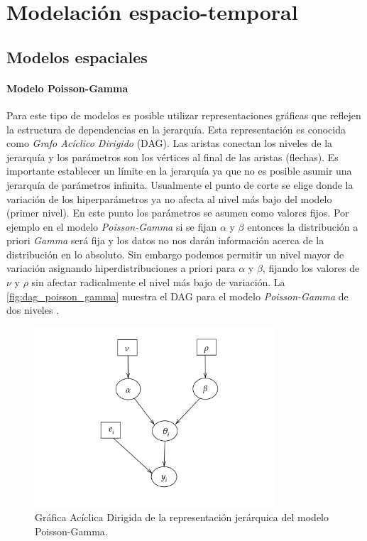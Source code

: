 \chapter{Modelación espacio-temporal} \label{chap:modeling}

\section{Modelos espaciales} \label{sec:spatial_models}

\subsubsection{Modelo Poisson-Gamma} \label{subsubsec:bayesian_poisson_gamma}

Para este tipo de modelos es posible utilizar representaciones gráficas que reflejen la estructura de dependencias en la jerarquía. Esta representación es conocida como \textit{Grafo Acíclico Dirigido} (DAG). Las aristas conectan los niveles de la jerarquía y los parámetros son los vértices al final de las aristas (flechas). Es importante establecer un límite en la jerarquía ya que no es posible asumir una jerarquía de parámetros infinita. Usualmente el punto de corte se elige donde la variación de los hiperparámetros ya no afecta al nivel más bajo del modelo (primer nivel). En este punto los parámetros se asumen como valores fijos. Por ejemplo en el modelo \textit{Poisson-Gamma} si se fijan $\alpha$ y $\beta$ entonces la distribución a priori \textit{Gamma} será fija y los datos no nos darán información acerca de la distribución en lo absoluto. Sin embargo podemos permitir un nivel mayor de variación asignando hiperdistribuciones a priori para $\alpha$ y $\beta$, fijando los valores de $\nu$ y $\rho$ sin afectar radicalmente el nivel más bajo de variación. La \autoref{fig:dag_poisson_gamma} muestra el DAG para el modelo \textit{Poisson-Gamma} de dos niveles \citep{lawson2013bayesian}.

\begin{figure}[htb!]
\centering
\includegraphics[width=0.8\textwidth]{img/example_hbm_lawson_01}
\caption{Gráfica Acíclica Dirigida de la representación jerárquica del modelo Poisson-Gamma.}\label{fig:dag_poisson_gamma}
\end{figure}